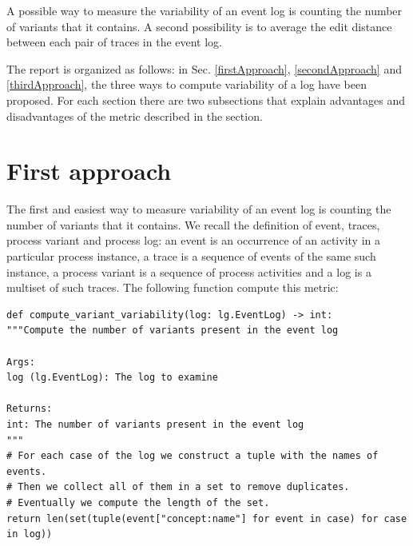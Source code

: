 \documentclass[12pt]{article}
\newenvironment{code}{\captionsetup{type=listing}}{}
\begin{document}
A possible way to measure the variability of an event log is counting the number of variants that it contains. A second possibility is to average the edit distance between each pair of traces in the event log. 

The report is organized as follows: in Sec. \ref{firstApproach}, \ref{secondApproach} and \ref{thirdApproach}, the three ways to compute variability of a log have been proposed. For each section there are two subsections that explain advantages and disadvantages of the metric described in the section.


\section*{First approach}\label{firstApproach}

The first and easiest way to measure variability of an event log is counting the number of variants that it contains. We recall the definition of event, traces, process variant and process log: an event is an occurrence of an activity in a particular process instance, a trace is a sequence of events of the same such instance, a process variant is a sequence of process activities and a log is a multiset of such traces. The following function compute this metric:

\begin{code}
	\label{code:code1}
	\begin{verbatim}
def compute_variant_variability(log: lg.EventLog) -> int:
"""Compute the number of variants present in the event log

Args:
log (lg.EventLog): The log to examine

Returns:
int: The number of variants present in the event log
"""
# For each case of the log we construct a tuple with the names of events.
# Then we collect all of them in a set to remove duplicates.
# Eventually we compute the length of the set.
return len(set(tuple(event["concept:name"] for event in case) for case in log))
	\end{verbatim}
\end{code}
\end{document}
